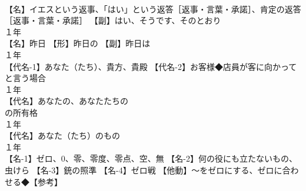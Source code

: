 \documentclass[8pt]{extreport}
\begin{document}
\begin{CJK}{UTF8}{min}
\\	【名】イエスという返事、「はい」という返答［返事・言葉・承諾］、肯定の返答［返事・言葉・承諾］ 【副】はい、そうです、そのとおり
\\	１年	
\\	【名】昨日 【形】昨日の 【副】昨日は
\\	１年	
\\	【代名-1】あなた（たち）、貴方、貴殿 【代名-2】お客様◆店員が客に向かって 
\\	と言う場合
\\	１年	
\\	【代名】あなたの、あなたたちの
\\	の所有格
\\	１年	
\\	【代名】あなた（たち）のもの
\\	１年	
\\	【名-1】ゼロ、0、零、零度、零点、空、無 【名-2】何の役にも立たないもの、虫けら 【名-3】銃の照準 【名-4】ゼロ戦 【他動】～をゼロにする、ゼロに合わせる◆【参考】
\end{CJK}
\end{document}
